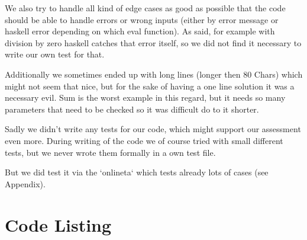 \documentclass[12pt,a4paper]{article}
\begin{document}
We also try to handle all kind of edge cases as good as possible that the code should be able to handle errors or wrong inputs (either by error message or haskell error depending on which eval function). As said, for example with division by zero haskell catches that error itself, so we did not find it necessary to write our own test for that.

Additionally we sometimes ended up with long lines (longer then 80 Chars) which might not seem that nice, but for the sake of having a one line solution it was a necessary evil. Sum is the worst example in this regard, but it needs so many parameters that need to be checked so it was difficult do to it shorter.

Sadly we didn't write any tests for our code, which might support our assessment even more. During writing of the code we of course tried with small different tests, but we never wrote them formally in a own test file.

But we did test it via the `onlineta` which tests already lots of cases (see Appendix).


\appendix
\section{Code Listing}

\inputminted{haskell}{src/Arithmetic.hs}
\end{document}
